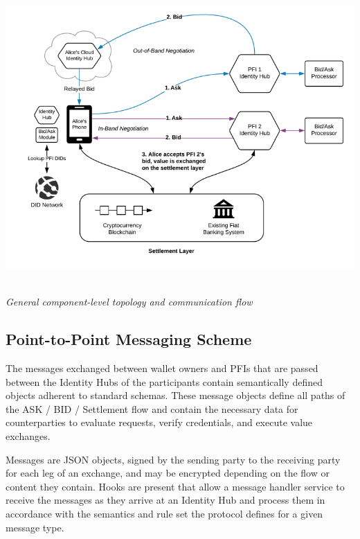 \documentclass[11pt]{article}
\begin{document}
\begin{center}
  \\ \includegraphics[width=15.61cm,height=11.83cm]{./diagrams/topology.png}{\small \textit{General component-level topology and communication flow}}
\end{center}


\vspace{1\baselineskip}
\subsection{Point-to-Point Messaging Scheme}

\vspace{1\baselineskip}
The messages exchanged between wallet owners and PFIs that are passed between the Identity Hubs of the participants contain semantically defined objects adherent to standard schemas. These message objects define all paths of the ASK / BID / Settlement flow and contain the necessary data for counterparties to evaluate requests, verify credentials, and execute value exchanges.

\vspace{1\baselineskip}
Messages are JSON objects, signed by the sending party to the receiving party for each leg of an exchange, and may be encrypted depending on the flow or content they contain. Hooks are present that allow a message handler service to receive the messages as they arrive at an Identity Hub and process them in accordance with the semantics and rule set the protocol defines for a given message type.
\end{document}
